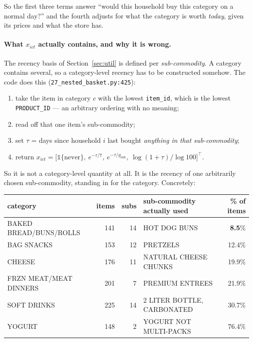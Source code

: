 \documentclass[11pt]{article}
\newcommand{\code}[1]{\texttt{#1}}
\begin{document}
So the first three terms answer ``would this household buy this category on a normal
day?'' and the fourth adjusts for what the category is worth \emph{today}, given its
prices and what the store has.

\paragraph{What $x_{ict}$ actually contains, and why it is wrong.} The recency basis of
Section~\ref{sec:util} is defined per \emph{sub-commodity}. A category contains several,
so a category-level recency has to be constructed somehow. The code does this
(\code{27\_nested\_basket.py:425}):

\begin{enumerate}
\item take the item in category $c$ with the lowest \code{item\_id}, which is the lowest
\code{PRODUCT\_ID} --- an arbitrary ordering with no meaning;
\item read off that one item's sub-commodity;
\item set $\tau$ = days since household $i$ last bought \emph{anything in that
sub-commodity};
\item return $x_{ict}=\bigl[\mathbb 1\{\text{never}\},\ e^{-\tau/7},\
e^{-\tau/g_{\mathrm{sub}}},\ \log(1+\tau)/\log 100\bigr]^{\top}$.
\end{enumerate}

So it is not a category-level quantity at all. It is the recency of one arbitrarily chosen
sub-commodity, standing in for the category. Concretely:

\begin{center}
\small\begin{tabular}{lrrlr}
\toprule
category & items & subs & sub-commodity actually used & \% of items \\
\midrule
BAKED BREAD/BUNS/ROLLS & 141 & 14 & HOT DOG BUNS & \textbf{8.5}\% \\
BAG SNACKS & 153 & 12 & PRETZELS & 12.4\% \\
CHEESE & 176 & 11 & NATURAL CHEESE CHUNKS & 19.9\% \\
FRZN MEAT/MEAT DINNERS & 201 & 7 & PREMIUM ENTREES & 21.9\% \\
SOFT DRINKS & 225 & 14 & 2 LITER BOTTLE, CARBONATED & 30.7\% \\
YOGURT & 148 & 2 & YOGURT NOT MULTI-PACKS & 76.4\% \\
\bottomrule
\end{tabular}
\end{center}
\end{document}
